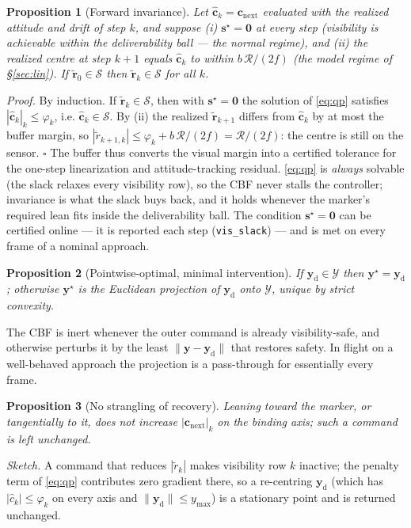 \documentclass[11pt]{article}
\newtheorem{prop}{Proposition}
\begin{document}
\begin{prop}[Forward invariance]\label{prop:inv}
Let $\hat{\boldsymbol{c}}_k=\boldsymbol{c}_\text{next}$ evaluated with the realized attitude and drift of
step $k$, and suppose (i) $\boldsymbol{s}^\star=\boldsymbol{0}$ at every step (visibility is achievable
within the deliverability ball --- the normal regime), and (ii) the realized centre at step $k{+}1$
equals $\hat{\boldsymbol{c}}_k$ to within $b\,\mathcal{R}/(2f)$ (the model regime of \S\ref{sec:lin}). If
$\tilde{\boldsymbol{r}}_0\in\mathcal{S}$ then $\tilde{\boldsymbol{r}}_k\in\mathcal{S}$ for all $k$.
\end{prop}
\noindent\emph{Proof.} By induction. If $\tilde{\boldsymbol{r}}_k\in\mathcal{S}$, then with
$\boldsymbol{s}^\star=\boldsymbol{0}$ the solution of \eqref{eq:qp} satisfies
$|\hat{\boldsymbol{c}}_k|_k\le\varphi_k$, i.e. $\hat{\boldsymbol{c}}_k\in\mathcal{S}$. By (ii) the realized
$\tilde{\boldsymbol{r}}_{k+1}$ differs from $\hat{\boldsymbol{c}}_k$ by at most the buffer margin, so
$|\tilde r_{k+1,k}|\le\varphi_k+b\,\mathcal{R}/(2f)=\mathcal{R}/(2f)$: the centre is still on the sensor.
$\square$
The buffer thus converts the visual margin into a certified tolerance for the one-step linearization and
attitude-tracking residual. \eqref{eq:qp} is \emph{always} solvable (the slack relaxes every visibility
row), so the CBF never stalls the controller; invariance is what the slack buys back, and it holds
whenever the marker's required lean fits inside the deliverability ball. The condition
$\boldsymbol{s}^\star=\boldsymbol{0}$ can be certified online --- it is reported each step
(\texttt{vis\_slack}) --- and is met on every frame of a nominal approach.

\begin{prop}[Pointwise-optimal, minimal intervention]\label{prop:min}
If $\boldsymbol{y}_\text{d}\in\mathcal{Y}$ then $\boldsymbol{y}^\star=\boldsymbol{y}_\text{d}$; otherwise
$\boldsymbol{y}^\star$ is the Euclidean projection of $\boldsymbol{y}_\text{d}$ onto $\mathcal{Y}$, unique
by strict convexity.
\end{prop}
\noindent The CBF is inert whenever the outer command is already visibility-safe, and otherwise perturbs
it by the least $\|\boldsymbol{y}-\boldsymbol{y}_\text{d}\|$ that restores safety. In flight on a
well-behaved approach the projection is a pass-through for essentially every frame.

\begin{prop}[No strangling of recovery]\label{prop:strangle}
Leaning toward the marker, or tangentially to it, does not increase $|\boldsymbol{c}_\text{next}|_k$ on
the binding axis; such a command is left unchanged.
\end{prop}
\noindent\emph{Sketch.} A command that reduces $|\tilde r_k|$ makes visibility row $k$ inactive; the
penalty term of \eqref{eq:qp} contributes zero gradient there, so a re-centring $\boldsymbol{y}_\text{d}$
(which has $|\hat c_k|\le\varphi_k$ on every axis and $\|\boldsymbol{y}_\text{d}\|\le y_\text{max}$) is a
stationary point and is returned unchanged.
\end{document}
